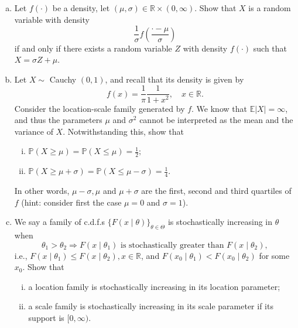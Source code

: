 \begin{exercise}
    \begin{enumerate}[(a)]
        \item Let \(f(\cdot)\) be a density, let \((\mu, \sigma) \in \mathbb{R} \times(0, \infty)\). Show that \(X\) is a random variable with density
        \[
        \frac{1}{\sigma} f\left(\frac{\cdot-\mu}{\sigma}\right)
        \]
        if and only if there exists a random variable \(Z\) with density \(f(\cdot)\) such that \(X=\sigma Z+\mu\).
        \item Let \(X \sim\) Cauchy \((0,1)\), and recall that its density is given by
        \[
        f(x)=\frac{1}{\pi} \frac{1}{1+x^{2}}, \quad x \in \mathbb{R} .
        \]
        Consider the location-scale family generated by \(f\). We know that \(\mathbb{E}|X|=\infty\), and thus the parameters \(\mu\) and \(\sigma^{2}\) cannot be interpreted as the mean and the variance of \(X\). Notwithstanding this, show that
        \begin{enumerate}[(i)]
            \item \(\mathbb{P}(X \geq \mu)=\mathbb{P}(X \leq \mu)=\frac{1}{2} ;\)
            \item \(\mathbb{P}(X \geq \mu+\sigma)=\mathbb{P}(X \leq \mu-\sigma)=\frac{1}{4}\). 
        \end{enumerate}  In other words, \(\mu-\sigma, \mu\) and \(\mu+\sigma\) are the first, second and third quartiles of \(f\) (hint: consider first the case \(\mu=0\) and \(\sigma=1\)). 
        \item We say a family of c.d.f.s \(\{F(x \mid \theta)\}_{\theta \in \Theta}\) is stochastically increasing in \(\theta\) when \[\theta_{1}>\theta_{2}\Rightarrow F\left(x \mid \theta_{1}\right)\text{ is stochastically greater than }F\left(x \mid \theta_{2}\right), \]i.e., \(F\left(x \mid \theta_{1}\right) \leq F\left(x \mid \theta_{2}\right), x \in \mathbb{R}\), and \(F\left(x_{0} \mid \theta_{1}\right)<F\left(x_{0} \mid \theta_{2}\right)\) for some \(x_{0}\). Show that 
        \begin{enumerate}[(i)]
            \item a location family is stochastically increasing in its location parameter; 
            \item a scale family is stochastically increasing in its scale parameter if its support is \([0, \infty)\).
        \end{enumerate}
    \end{enumerate}
\end{exercise}

